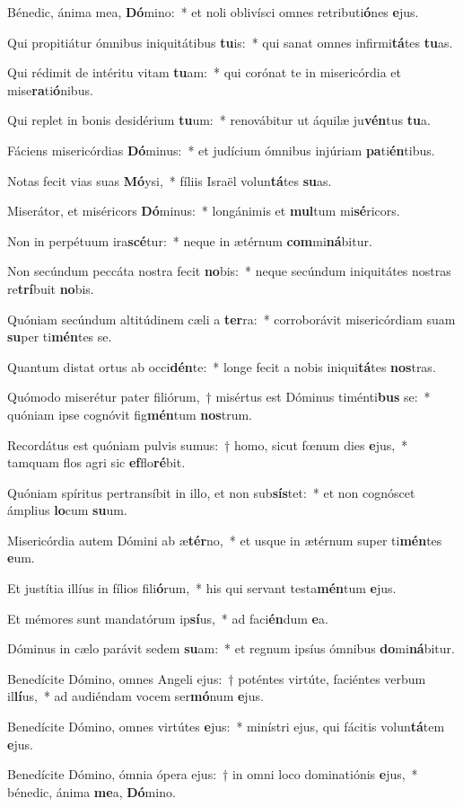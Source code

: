 \item Bénedic, ánima mea, \textbf{Dó}mino:~* et noli oblivísci omnes retributi\textbf{ó}nes \textbf{e}jus.
\item Qui propitiátur ómnibus iniquitátibus \textbf{tu}is:~* qui sanat omnes infirmi\textbf{tá}tes \textbf{tu}as.
\item Qui rédimit de intéritu vitam \textbf{tu}am:~* qui corónat te in misericórdia et mise\textbf{ra}ti\textbf{ó}nibus.
\item Qui replet in bonis desidérium \textbf{tu}um:~* renovábitur ut áquilæ ju\textbf{vén}tus \textbf{tu}a.
\item Fáciens misericórdias \textbf{Dó}minus:~* et judícium ómnibus injúriam \textbf{pa}ti\textbf{én}tibus.
\item Notas fecit vias suas \textbf{Mó}ysi,~* fíliis Israël volun\textbf{tá}tes \textbf{su}as.
\item Miserátor, et miséricors \textbf{Dó}minus:~* longánimis et \textbf{mul}tum mi\textbf{sé}ricors.
\item Non in perpétuum ira\textbf{scé}tur:~* neque in ætérnum \textbf{com}mi\textbf{ná}bitur.
\item Non secúndum peccáta nostra fecit \textbf{no}bis:~* neque secúndum iniquitátes nostras re\textbf{trí}buit \textbf{no}bis.
\item Quóniam secúndum altitúdinem cæli a \textbf{ter}ra:~* corroborávit misericórdiam suam \textbf{su}per ti\textbf{mén}tes se.
\item Quantum distat ortus ab occi\textbf{dén}te:~* longe fecit a nobis iniqui\textbf{tá}tes \textbf{nos}tras.
\item Quómodo miserétur pater filiórum,~† misértus est Dóminus timénti\textbf{bus} se:~* quóniam ipse cognóvit fig\textbf{mén}tum \textbf{nos}trum.
\item Recordátus est quóniam pulvis sumus:~† homo, sicut fœnum dies \textbf{e}jus,~* tamquam flos agri sic \textbf{ef}flo\textbf{ré}bit.
\item Quóniam spíritus pertransíbit in illo, et non sub\textbf{sís}tet:~* et non cognóscet ámplius \textbf{lo}cum \textbf{su}um.
\item Misericórdia autem Dómini ab æ\textbf{tér}no,~* et usque in ætérnum super ti\textbf{mén}tes \textbf{e}um.
\item Et justítia illíus in fílios fili\textbf{ó}rum,~* his qui servant testa\textbf{mén}tum \textbf{e}jus.
\item Et mémores sunt mandatórum ip\textbf{sí}us,~* ad faci\textbf{én}dum \textbf{e}a.
\item Dóminus in cælo parávit sedem \textbf{su}am:~* et regnum ipsíus ómnibus \textbf{do}mi\textbf{ná}bitur.
\item Benedícite Dómino, omnes Angeli ejus:~† poténtes virtúte, faciéntes verbum il\textbf{lí}us,~* ad audiéndam vocem ser\textbf{mó}num \textbf{e}jus.
\item Benedícite Dómino, omnes virtútes \textbf{e}jus:~* minístri ejus, qui fácitis volun\textbf{tá}tem \textbf{e}jus.
\item Benedícite Dómino, ómnia ópera ejus:~† in omni loco dominatiónis \textbf{e}jus,~* bénedic, ánima \textbf{me}a, \textbf{Dó}mino.
